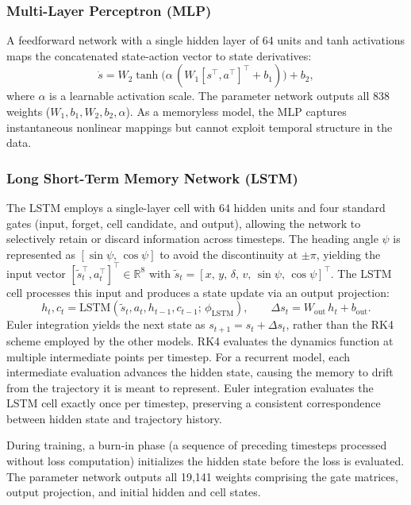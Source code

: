 \subsubsection{Multi-Layer Perceptron (MLP)}
\label{sec:mlp}

A feedforward network with a single hidden layer of 64 units and tanh activations maps the concatenated state-action vector to state derivatives:
\begin{equation}
  \dot{s} = W_2 \tanh\!\big(\alpha\,(W_1 [s^\top, a^\top]^\top + b_1)\big) + b_2,
\end{equation}
where $\alpha$ is a learnable activation scale. The parameter network outputs all 838 weights ($W_1, b_1, W_2, b_2, \alpha$). As a memoryless model, the MLP captures instantaneous nonlinear mappings but cannot exploit temporal structure in the data.

\subsubsection{Long Short-Term Memory Network (LSTM)}
\label{sec:lstm}

The LSTM employs a single-layer cell with 64 hidden units and four standard gates (input, forget, cell candidate, and output), allowing the network to selectively retain or discard information across timesteps. The heading angle $\psi$ is represented as $[\sin\psi,\, \cos\psi]$ to avoid the discontinuity at $\pm\pi$, yielding the input vector $[\tilde{s}_t^\top, a_t^\top]^\top \in \mathbb{R}^{8}$ with $\tilde{s}_t = [x,\, y,\, \delta,\, v,\, \sin\psi,\, \cos\psi]^\top$. The LSTM cell processes this input and produces a state update via an output projection:
\begin{equation}
  h_t, c_t = \text{LSTM}(\tilde{s}_t, a_t, h_{t-1}, c_{t-1};\, \phi_{\text{LSTM}}), \qquad \Delta s_t = W_{\text{out}}\, h_t + b_{\text{out}}.
\end{equation}
Euler integration yields the next state as $s_{t+1} = s_t + \Delta s_t$, rather than the RK4 scheme employed by the other models. RK4 evaluates the dynamics function at multiple intermediate points per timestep. For a recurrent model, each intermediate evaluation advances the hidden state, causing the memory to drift from the trajectory it is meant to represent. Euler integration evaluates the LSTM cell exactly once per timestep, preserving a consistent correspondence between hidden state and trajectory history.

During training, a burn-in phase (a sequence of preceding timesteps processed without loss computation) initializes the hidden state before the loss is evaluated. The parameter network outputs all 19,141 weights comprising the gate matrices, output projection, and initial hidden and cell states.

